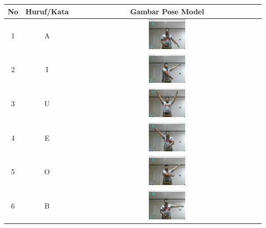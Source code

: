 \begin{table}[!hbt]
	\centering
	\label{tbl:Tabel Contoh Huruf/Kata dan Gambar Pose Model CNN Xception Orang Pertama}
	\begin{tabular}{|c|c|c|}
	\hline
	No & Huruf/Kata & Gambar Pose Model  \\
	\hline
	1 & A & \includegraphics[width=0.2\textwidth]{gambar/bener/HurufA_ModelCNNXception_Dawe.png} \\
	\hline
	2 & I & \includegraphics[width=0.2\textwidth]{gambar/bener/HurufI_ModelCNNXception_Dawe.png} \\
	\hline
	3 & U & \includegraphics[width=0.2\textwidth]{gambar/bener/HurufU_ModelCNNXception_Dawe.png} \\
	\hline
	4 & E & \includegraphics[width=0.2\textwidth]{gambar/bener/HurufE_ModelCNNXception_Dawe.png} \\
	\hline
	5 & O & \includegraphics[width=0.2\textwidth]{gambar/bener/HurufO_ModelCNNXception_Dawe.png} \\
	\hline
	6 & B & \includegraphics[width=0.2\textwidth]{gambar/bener/HurufB_ModelCNNXception_Dawe.png} \\

\end{tabular}
\end{table}
